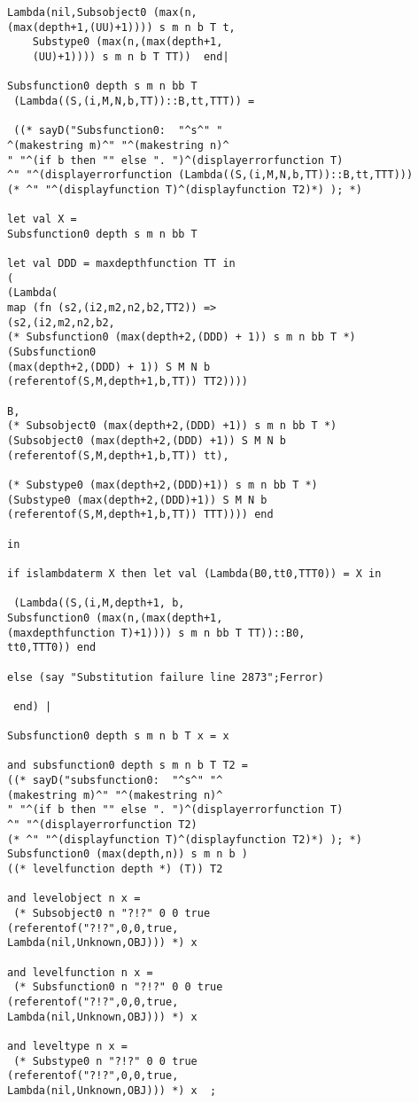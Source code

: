 \documentclass[12pt]{article}
\begin{document}
\begin{verbatim}
Lambda(nil,Subsobject0 (max(n,
(max(depth+1,(UU)+1)))) s m n b T t,
    Substype0 (max(n,(max(depth+1,
	(UU)+1)))) s m n b T TT))  end|

Subsfunction0 depth s m n bb T
 (Lambda((S,(i,M,N,b,TT))::B,tt,TTT)) =
 
 ((* sayD("Subsfunction0:  "^s^" "
^(makestring m)^" "^(makestring n)^
" "^(if b then "" else ". ")^(displayerrorfunction T)
^" "^(displayerrorfunction (Lambda((S,(i,M,N,b,TT))::B,tt,TTT)))
(* ^" "^(displayfunction T)^(displayfunction T2)*) ); *)

let val X = 
Subsfunction0 depth s m n bb T

let val DDD = maxdepthfunction TT in
(
(Lambda(
map (fn (s2,(i2,m2,n2,b2,TT2)) =>
(s2,(i2,m2,n2,b2,
(* Subsfunction0 (max(depth+2,(DDD) + 1)) s m n bb T *)
(Subsfunction0 
(max(depth+2,(DDD) + 1)) S M N b
(referentof(S,M,depth+1,b,TT)) TT2)))) 

B,
(* Subsobject0 (max(depth+2,(DDD) +1)) s m n bb T *)
(Subsobject0 (max(depth+2,(DDD) +1)) S M N b 
(referentof(S,M,depth+1,b,TT)) tt),

(* Substype0 (max(depth+2,(DDD)+1)) s m n bb T *)
(Substype0 (max(depth+2,(DDD)+1)) S M N b 
(referentof(S,M,depth+1,b,TT)) TTT)))) end

in

if islambdaterm X then let val (Lambda(B0,tt0,TTT0)) = X in

 (Lambda((S,(i,M,depth+1, b,
Subsfunction0 (max(n,(max(depth+1,
(maxdepthfunction T)+1)))) s m n bb T TT))::B0,
tt0,TTT0)) end

else (say "Substitution failure line 2873";Ferror)

 end) |

Subsfunction0 depth s m n b T x = x

and subsfunction0 depth s m n b T T2 =
((* sayD("subsfunction0:  "^s^" "^
(makestring m)^" "^(makestring n)^
" "^(if b then "" else ". ")^(displayerrorfunction T)
^" "^(displayerrorfunction T2)
(* ^" "^(displayfunction T)^(displayfunction T2)*) ); *)
Subsfunction0 (max(depth,n)) s m n b )
((* levelfunction depth *) (T)) T2

and levelobject n x = 
 (* Subsobject0 n "?!?" 0 0 true 
(referentof("?!?",0,0,true,
Lambda(nil,Unknown,OBJ))) *) x 

and levelfunction n x = 
 (* Subsfunction0 n "?!?" 0 0 true 
(referentof("?!?",0,0,true,
Lambda(nil,Unknown,OBJ))) *) x 

and leveltype n x = 
 (* Substype0 n "?!?" 0 0 true 
(referentof("?!?",0,0,true,
Lambda(nil,Unknown,OBJ))) *) x  ;


\end{verbatim}
\end{document}
